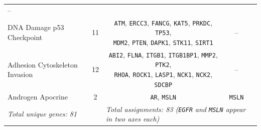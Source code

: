 \documentclass[11pt,a4paper]{article}
\begin{document}
\begin{table}[!htbp]
{\begin{tabular}{lcccl}
  -- & \citet{Denkert2018TILs,Tokunaga2018CXCL9} \\
\addlinespace
DNA Damage p53 Checkpoint & 11 &
  \makecell[cl]{\texttt{ATM}, \texttt{ERCC3}, \texttt{FANCG}, \texttt{KAT5}, \texttt{PRKDC}, \texttt{TP53},\\
               \texttt{MDM2}, \texttt{PTEN}, \texttt{DAPK1}, \texttt{STK11}, \texttt{SIRT1}} &
  -- & \citet{TCGA2012BRCA,Shiloh2003ATM,DAndrea2003Fanconi} \\
\addlinespace
Adhesion Cytoskeleton Invasion & 12 &
  \makecell[cl]{\texttt{ABI2}, \texttt{FLNA}, \texttt{ITGB1}, \texttt{ITGB1BP1}, \texttt{MMP2}, \texttt{PTK2},\\
               \texttt{RHOA}, \texttt{ROCK1}, \texttt{LASP1}, \texttt{NCK1}, \texttt{NCK2}, \texttt{SDCBP}} &
  -- & \citet{Desgrosellier2010Integrins,Sahai2002RhoGTPases} \\
\addlinespace
Androgen Apocrine & 2 &
  \texttt{AR}, \texttt{MSLN} &
  \texttt{MSLN} & \citet{Farmer2005Apocrine,Lehmann2011TNBC} \\
\midrule
\multicolumn{2}{l}{\textit{Total unique genes: 81}} & \multicolumn{3}{l}{\textit{Total assignments: 83 (\texttt{EGFR} and \texttt{MSLN} appear in two axes each)}} \\
\bottomrule
\end{tabular}%
}
\end{table}
\end{document}
